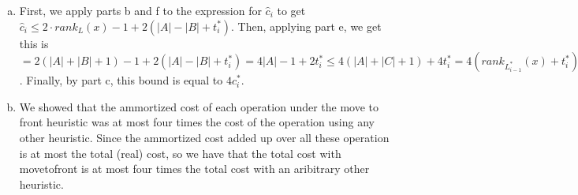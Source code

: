 \documentclass{article}
\begin{document}
\begin{enumerate}[a.]
\item
First, we apply parts b and f to the expression for $\hat{c}_i$ to get $\hat{c}_i \le 2\cdot rank_{L}(x) -1 + 2(|A|-|B|+t_i^*)$. Then, applying part e, we get this is $= 2(|A|+|B|+1) - 1+ 2(|A|-|B|+t_i^*) = 4|A| -1+2t_i^*\le 4(|A|+|C|+1) +4t_i^* = 4(rank_{L_{i-1}^*}(x) + t_i^*)$. Finally, by part c, this bound is equal to $4c_i^*$.
\item
We showed that the ammortized cost of each operation under the move to front heuristic was at most four times the cost of the operation using any other heuristic. Since the ammortized cost added up over all these operation is at most the total (real) cost, so we have that the total cost with movetofront is at most four times the total cost with an aribitrary other heuristic.

\end{enumerate}
\end{document}
